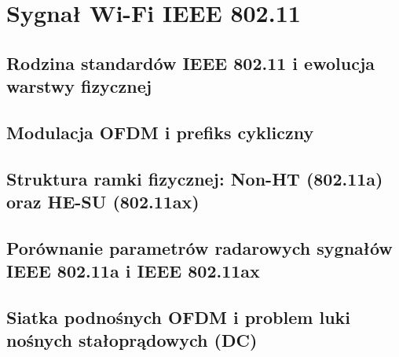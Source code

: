 \section{Sygnał Wi-Fi IEEE 802.11}
\label{sec:wifi_phy}


\subsection{Rodzina standardów IEEE 802.11 i ewolucja warstwy fizycznej}
\label{subsec:wifi_standards}

\subsection{Modulacja OFDM i prefiks cykliczny}
\label{subsec:wifi_ofdm_cp}

\subsection{Struktura ramki fizycznej: Non-HT (802.11a) oraz HE-SU (802.11ax)}
\label{subsec:wifi_frame_structure}

\subsection{Porównanie parametrów radarowych sygnałów IEEE 802.11a i IEEE 802.11ax}
\label{subsec:wifi_radar_parameters}

\subsection{Siatka podnośnych OFDM i problem luki nośnych stałoprądowych (DC)}
\label{subsec:wifi_subcarriers_dc}
